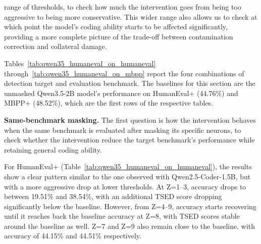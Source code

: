 \documentclass[mscthesis]{usiinfthesis}
\begin{document}
range of thresholds, to check how much the intervention goes from being too aggressive to being more conservative.
This wider range also allows us to check at which point the model's coding ability
starts to be affected significantly, providing a more complete picture of the
trade-off between contamination correction and collateral damage.
\par\vspace{1em}
Tables~\ref{tab:qwen35_humaneval_on_humaneval} through~\ref{tab:qwen35_humaneval_on_mbpp}
report the four combinations of detection target and evaluation benchmark. 
The baselines for this section are the unmasked Qwen3.5-2B model's performance on HumanEval+ (44.76\%) and MBPP+ (48.52\%), which are the first rows of the respective tables.
\par\vspace{1em}
\textbf{Same-benchmark masking. }
 The first question is how the intervention behaves when the same benchmark is evaluated after masking its specific neurons,
to check whether the intervention reduce the target benchmark's performance while
retaining general coding ability.
\par\vspace{1em}
For HumanEval+ (Table~\ref{tab:qwen35_humaneval_on_humaneval}), the results show a clear pattern similar
to the one observed with Qwen2.5-Coder-1.5B, but with a more aggressive drop at lower thresholds.
At Z=1--3, accuracy drops to between 19.51\% and 38.54\%, with an additional TSED score
dropping significantly below the baseline.
However, from Z=4--9, accuracy starts recovering until it reaches back the baseline accuracy at Z=8, with TSED scores stable around the baseline as well.
Z=7 and Z=9 also remain close to the baseline, with accuracy of 44.15\% and 44.51\% respectively.
\end{document}
